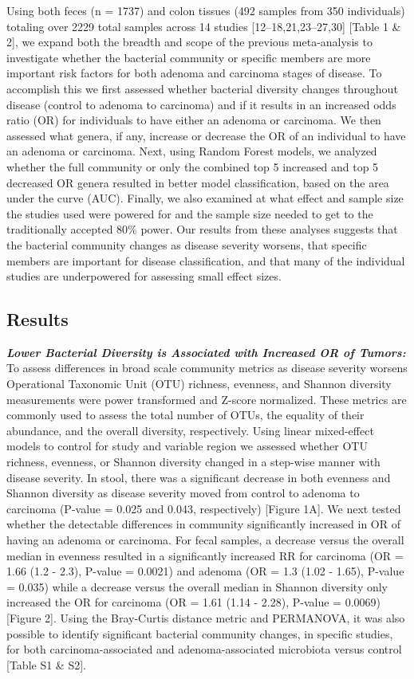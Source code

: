 \documentclass[12pt,]{article}
\begin{document}
Using both feces (n = 1737) and colon tissues (492 samples from 350
individuals) totaling over 2229 total samples across 14 studies
{[}12--18,21,23--27,30{]} {[}Table 1 \& 2{]}, we expand both the breadth
and scope of the previous meta-analysis to investigate whether the
bacterial community or specific members are more important risk factors
for both adenoma and carcinoma stages of disease. To accomplish this we
first assessed whether bacterial diversity changes throughout disease
(control to adenoma to carcinoma) and if it results in an increased odds
ratio (OR) for individuals to have either an adenoma or carcinoma. We
then assessed what genera, if any, increase or decrease the OR of an
individual to have an adenoma or carcinoma. Next, using Random Forest
models, we analyzed whether the full community or only the combined top
5 increased and top 5 decreased OR genera resulted in better model
classification, based on the area under the curve (AUC). Finally, we
also examined at what effect and sample size the studies used were
powered for and the sample size needed to get to the traditionally
accepted 80\% power. Our results from these analyses suggests that the
bacterial community changes as disease severity worsens, that specific
members are important for disease classification, and that many of the
individual studies are underpowered for assessing small effect sizes.

\newpage

\subsection{Results}\label{results}

\textbf{\emph{Lower Bacterial Diversity is Associated with Increased OR
of Tumors:}} To assess differences in broad scale community metrics as
disease severity worsens Operational Taxonomic Unit (OTU) richness,
evenness, and Shannon diversity measurements were power transformed and
Z-score normalized. These metrics are commonly used to assess the total
number of OTUs, the equality of their abundance, and the overall
diversity, respectively. Using linear mixed-effect models to control for
study and variable region we assessed whether OTU richness, evenness, or
Shannon diversity changed in a step-wise manner with disease severity.
In stool, there was a significant decrease in both evenness and Shannon
diversity as disease severity moved from control to adenoma to carcinoma
(P-value = 0.025 and 0.043, respectively) {[}Figure 1A{]}. We next
tested whether the detectable differences in community significantly
increased in OR of having an adenoma or carcinoma. For fecal samples, a
decrease versus the overall median in evenness resulted in a
significantly increased RR for carcinoma (OR = 1.66 (1.2 - 2.3), P-value
= 0.0021) and adenoma (OR = 1.3 (1.02 - 1.65), P-value = 0.035) while a
decrease versus the overall median in Shannon diversity only increased
the OR for carcinoma (OR = 1.61 (1.14 - 2.28), P-value = 0.0069)
{[}Figure 2{]}. Using the Bray-Curtis distance metric and PERMANOVA, it
was also possible to identify significant bacterial community changes,
in specific studies, for both carcinoma-associated and
adenoma-associated microbiota versus control {[}Table S1 \& S2{]}.
\end{document}
